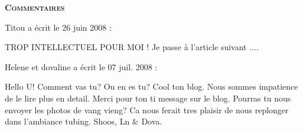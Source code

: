 \bigskip
\textbf{\textsc{Commentaires}}

\medskip
Titou a écrit le 26 juin 2008 :
\begin{displayquote}
TROP INTELLECTUEL POUR MOI ! 
Je passe à l'article suivant ....
\end{displayquote}

\medskip
Helene et dovaline a écrit le 07 juil. 2008 :
\begin{displayquote}
Hello U!
Comment vas tu? Ou en es tu?
Cool ton blog. Nous sommes impatience de le lire plus en detail.
Merci pour ton ti message sur le blog. 
Pourras tu nous envoyer les photos de vang vieng? Ca nous ferait tres plaisir de nous replonger dans l'ambiance tubing.
Shoos,
Ln & Dova.
\end{displayquote}

